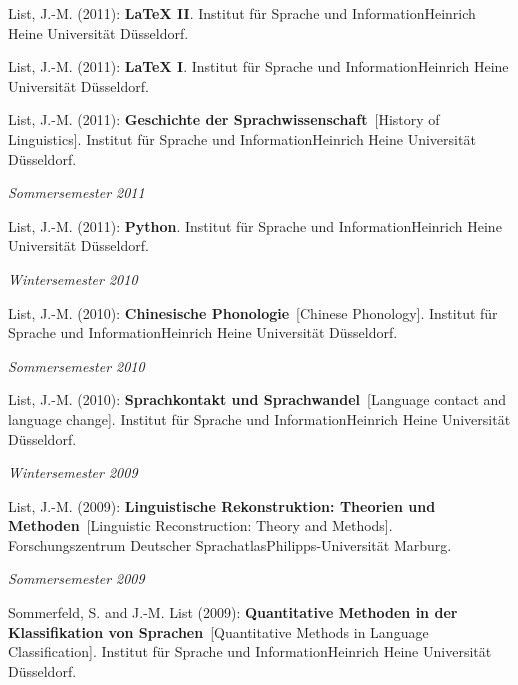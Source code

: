 \nopagebreak\noindent List, J.-M. (2011): \textbf{LaTeX II}. Institut für Sprache und InformationHeinrich Heine Universität Düsseldorf.\vspace{0.25cm}
\par
\nopagebreak\noindent List, J.-M. (2011): \textbf{LaTeX I}. Institut für Sprache und InformationHeinrich Heine Universität Düsseldorf.\vspace{0.25cm}
\par
\nopagebreak\noindent List, J.-M. (2011): \textbf{Geschichte der Sprachwissenschaft}\ [History of Linguistics]. Institut für Sprache und InformationHeinrich Heine Universität Düsseldorf.\vspace{0.25cm}
\par
\noindent\textit{Sommersemester 2011}\par\nopagebreak\vspace{0.25cm}
\nopagebreak\noindent List, J.-M. (2011): \textbf{Python}. Institut für Sprache und InformationHeinrich Heine Universität Düsseldorf.\vspace{0.25cm}
\par
\noindent\textit{Wintersemester 2010}\par\nopagebreak\vspace{0.25cm}
\nopagebreak\noindent List, J.-M. (2010): \textbf{Chinesische Phonologie}\ [Chinese Phonology]. Institut für Sprache und InformationHeinrich Heine Universität Düsseldorf.\vspace{0.25cm}
\par
\noindent\textit{Sommersemester 2010}\par\nopagebreak\vspace{0.25cm}
\nopagebreak\noindent List, J.-M. (2010): \textbf{Sprachkontakt und Sprachwandel}\ [Language contact and language change]. Institut für Sprache und InformationHeinrich Heine Universität Düsseldorf.\vspace{0.25cm}
\par
\noindent\textit{Wintersemester 2009}\par\nopagebreak\vspace{0.25cm}
\nopagebreak\noindent List, J.-M. (2009): \textbf{Linguistische Rekonstruktion: Theorien und Methoden}\ [Linguistic Reconstruction: Theory and Methods]. Forschungszentrum Deutscher SprachatlasPhilipps-Universität Marburg.\vspace{0.25cm}
\par
\noindent\textit{Sommersemester 2009}\par\nopagebreak\vspace{0.25cm}
\nopagebreak\noindent Sommerfeld, S. and J.-M. List (2009): \textbf{Quantitative Methoden in der Klassifikation von Sprachen}\ [Quantitative Methods in Language Classification]. Institut für Sprache und InformationHeinrich Heine Universität Düsseldorf.\vspace{0.25cm}
\par
